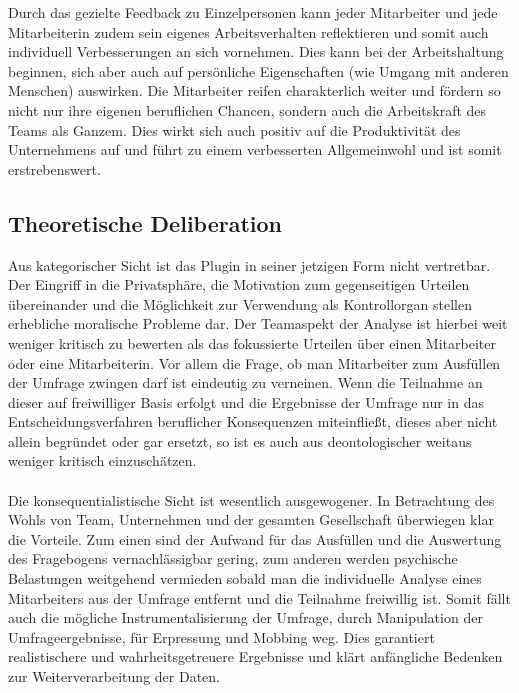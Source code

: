 \documentclass[a4paper,12pt,]{article}
\begin{document}
Durch das gezielte Feedback zu Einzelpersonen kann jeder Mitarbeiter und jede Mitarbeiterin zudem sein eigenes Arbeitsverhalten reflektieren und somit auch individuell Verbesserungen an sich vornehmen. Dies kann bei der Arbeitshaltung beginnen, sich aber auch auf persönliche Eigenschaften (wie Umgang mit anderen Menschen) auswirken. Die Mitarbeiter reifen charakterlich weiter und fördern so nicht nur ihre eigenen beruflichen Chancen, sondern auch die Arbeitskraft des Teams als Ganzem. Dies wirkt sich auch positiv auf die Produktivität des Unternehmens auf und führt zu einem verbesserten Allgemeinwohl und ist somit erstrebenswert.


\subsection{Theoretische Deliberation}
Aus kategorischer Sicht ist das Plugin in seiner jetzigen Form nicht vertretbar. Der Eingriff in die Privatsphäre, die Motivation zum gegenseitigen Urteilen übereinander und die Möglichkeit zur Verwendung als Kontrollorgan stellen erhebliche moralische Probleme dar. Der Teamaspekt der Analyse ist hierbei weit weniger kritisch zu bewerten als das fokussierte Urteilen über einen Mitarbeiter oder eine Mitarbeiterin. Vor allem die Frage, ob man Mitarbeiter zum Ausfüllen der Umfrage zwingen darf ist eindeutig zu verneinen. Wenn die Teilnahme an dieser auf freiwilliger Basis erfolgt und die Ergebnisse der Umfrage nur in das Entscheidungsverfahren beruflicher Konsequenzen miteinfließt, dieses aber nicht allein begründet oder gar ersetzt, so ist es auch aus deontologischer weitaus weniger kritisch einzuschätzen.
\paragraph{}Die konsequentialistische Sicht ist wesentlich ausgewogener. In Betrachtung des Wohls von Team, Unternehmen und der gesamten Gesellschaft überwiegen klar die Vorteile. Zum einen sind der Aufwand für das Ausfüllen und die Auswertung des Fragebogens vernachlässigbar gering, zum anderen werden psychische Belastungen weitgehend vermieden sobald man die individuelle Analyse eines Mitarbeiters aus der Umfrage entfernt und die Teilnahme freiwillig ist. Somit fällt auch die mögliche Instrumentalisierung der Umfrage, durch Manipulation der Umfrageergebnisse, für Erpressung und Mobbing weg. Dies garantiert realistischere und wahrheitsgetreuere Ergebnisse und klärt anfängliche Bedenken zur Weiterverarbeitung der Daten.
\end{document}
